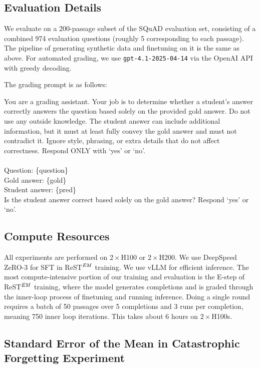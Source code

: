 \documentclass{article}
\begin{document}
\subsection{Evaluation Details}

We evaluate on a 200-passage subset of the SQuAD evaluation set, consisting of a combined 974 evaluation questions (roughly 5 corresponding to each passage). The pipeline of generating synthetic data and finetuning on it is the same as above. For automated grading, we use \texttt{gpt-4.1-2025-04-14} \citep{openai2024gpt4technicalreport} via the OpenAI API with greedy decoding.

The grading prompt is as follows:
\begin{tcolorbox}
You are a grading assistant. Your job is to determine whether a student's answer correctly answers the question based solely on the provided gold answer. Do not use any outside knowledge. The student answer can include additional information, but it must at least fully convey the gold answer and must not contradict it. Ignore style, phrasing, or extra details that do not affect correctness. Respond ONLY with `yes' or `no'. \\ \\
Question: \{question\} \\
Gold answer: \{gold\} \\
Student answer: \{pred\} \\
Is the student answer correct based solely on the gold answer? Respond `yes' or `no'.
\end{tcolorbox}

\subsection{Compute Resources}
\label{app:computeresources}

All experiments are performed on $2\times$H100 or $2\times$H200. We use DeepSpeed ZeRO-3 \citep{rasley2020deepspeed} for SFT in ReST$^\text{\textit{EM}}$ training. We use vLLM \citep{kwon2023efficient} for efficient inference. The most compute-intensive portion of our training and evaluation is the E-step of ReST$^\text{\textit{EM}}$ training, where the model generates completions and is graded through the inner-loop process of finetuning and running inference. Doing a single round requires a batch of 50 passages over 5 completions and 3 runs per completion, meaning 750 inner loop iterations. This takes about 6 hours on $2\times$H100s. 

\subsection{Standard Error of the Mean in Catastrophic Forgetting Experiment}
\label{app:SEM}
\end{document}
